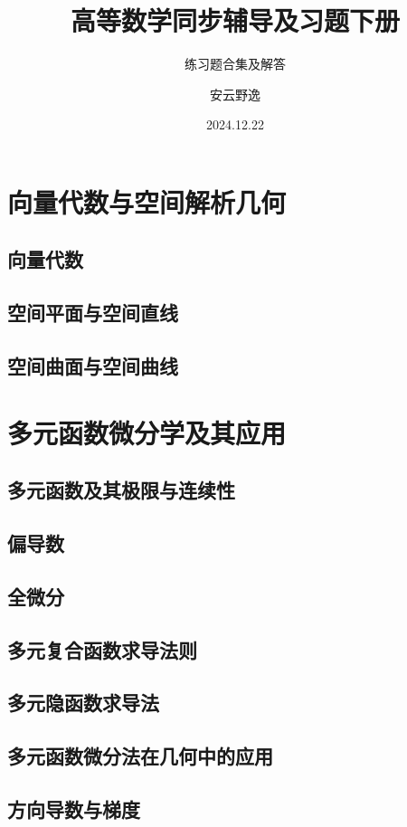 \documentclass[lang=cn,10pt]{elegantbook}
\title{高等数学同步辅导及习题下册}
\subtitle{练习题合集及解答}
\author{安云野逸}
\institute{清疏大学}
\date{2024.12.22}
\begin{document}
\maketitle
\frontmatter

\tableofcontents

\mainmatter

\chapter{向量代数与空间解析几何}
\section{向量代数}
\section{空间平面与空间直线}
\section{空间曲面与空间曲线}



\chapter{多元函数微分学及其应用}
\section{多元函数及其极限与连续性}
\section{偏导数}
\section{全微分}
\section{多元复合函数求导法则}
\section{多元隐函数求导法}
\section{多元函数微分法在几何中的应用}
\section{方向导数与梯度}
\end{document}
